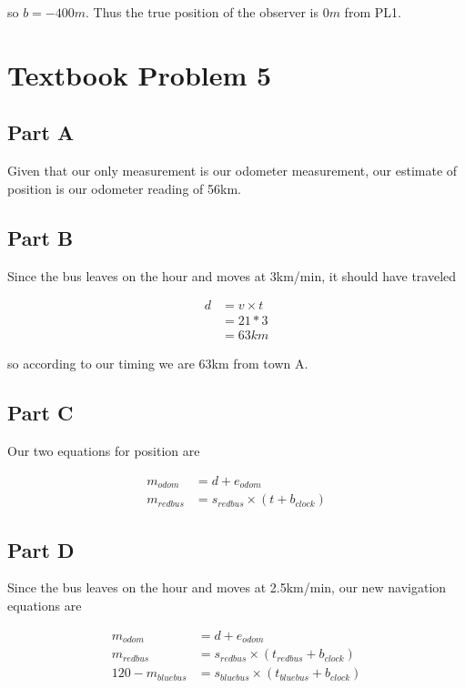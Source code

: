 \documentclass[]{article}
\begin{document}
so $b = -400m$. 
Thus the true position of the observer is $0m$ from PL1.

\section{Textbook Problem 5}

\subsection{Part A}

Given that our only measurement is our odometer measurement, our estimate of position is our odometer reading of 56km.

\subsection{Part B}

Since the bus leaves on the hour and moves at 3km/min, it should have traveled

\begin{align*}
	d &= v \times t \\
	&= 21 * 3 \\
	&= 63km
\end{align*}

so according to our timing we are 63km from town A.

\subsection{Part C}

Our two equations for position are

\begin{align*}
	m_{odom} &= d + e_{odom} \\
	m_{red bus} &= s_{red bus} \times (t + b_{clock})
\end{align*}

\subsection{Part D}

Since the bus leaves on the hour and moves at 2.5km/min, our new navigation equations are

\begin{align*}
	m_{odom} &= d + e_{odom} \\
	m_{red bus} &= s_{red bus} \times (t_{red bus} + b_{clock}) \\
	120 - m_{blue bus} &=  s_{blue bus} \times (t_{blue bus} + b_{clock})
\end{align*}
\end{document}
